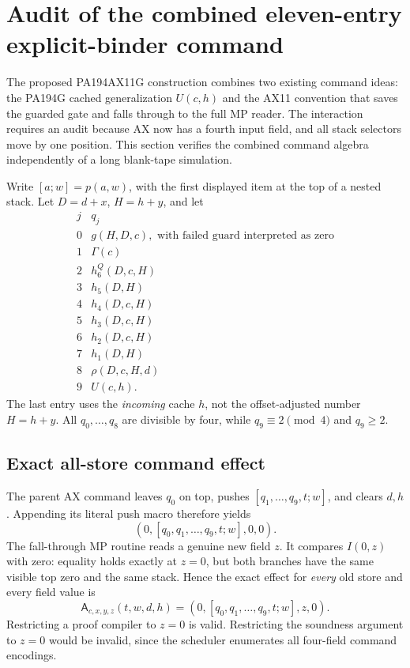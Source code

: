 \section{Audit of the combined eleven-entry explicit-binder command}
\label{sec:ax11g-audit}

The proposed PA194AX11G construction combines two existing command ideas:
the PA194G cached generalization $U(c,h)$ and the AX11 convention that saves
the guarded gate and falls through to the full MP reader. The interaction
requires an audit because AX now has a fourth input field, and all stack
selectors move by one position. This section verifies the combined command
algebra independently of a long blank-tape simulation.

Write $[a;w]=p(a,w)$, with the first displayed item at the top of a nested
stack. Let $D=d+x$, $H=h+y$, and let
\[
\begin{array}{c|l}
j&q_j\\\hline
0&g(H,D,c),\text{ with failed guard interpreted as zero}\\
1&\Gamma(c)\\
2&h_6^Q(D,c,H)\\
3&h_5(D,H)\\
4&h_4(D,c,H)\\
5&h_3(D,c,H)\\
6&h_2(D,c,H)\\
7&h_1(D,H)\\
8&\rho(D,c,H,d)\\
9&U(c,h).
\end{array}
\]
The last entry uses the \emph{incoming} cache $h$, not the offset-adjusted
number $H=h+y$. All $q_0,\ldots,q_8$ are divisible by four, while
$q_9\equiv2\pmod4$ and $q_9\ge2$.

\subsection{Exact all-store command effect}

The parent AX command leaves $q_0$ on top, pushes
$[q_1,\ldots,q_9,t;w]$, and clears $d,h$. Appending its literal push macro
therefore yields
\[
 (0,[q_0,q_1,\ldots,q_9,t;w],0,0).
\]
The fall-through MP routine reads a genuine new field $z$. It compares
$I(0,z)$ with zero: equality holds exactly at $z=0$, but both branches
have the same visible top zero and the same stack. Hence the exact effect
for \emph{every} old store and every field value is
\[
 \mathsf A_{c,x,y,z}(t,w,d,h)
       =(0,[q_0,q_1,\ldots,q_9,t;w],z,0).
 \tag{G11-A}
\]
Restricting a proof compiler to $z=0$ is valid. Restricting the soundness
argument to $z=0$ would be invalid, since the scheduler enumerates all
four-field command encodings.

